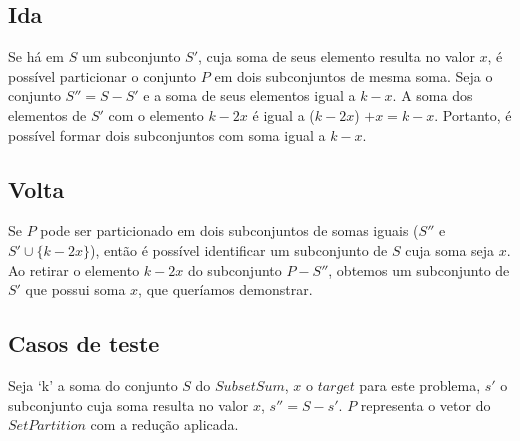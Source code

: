 \documentclass[12pt]{article}
\begin{document}
\subsection{Ida}

Se há em $S$ um subconjunto $S'$, cuja soma de seus elemento resulta no valor $x$, é possível particionar o conjunto $P$ em dois subconjuntos de mesma soma. Seja o conjunto $S'' = S - S'$ e a soma de seus elementos igual a $k-x$. A soma dos elementos de $S'$ com o elemento $k-2x$ é igual a ($k-2x$) $+ x = k-x$. Portanto, é possível formar dois subconjuntos com soma igual a $k-x$.

\subsection{Volta}

Se $P$ pode ser particionado em dois subconjuntos de somas iguais ($S''$ e $S' \cup \{k - 2x\}$), então é possível identificar um subconjunto de $S$ cuja soma seja $x$. Ao retirar o elemento $k - 2x$ do subconjunto $P - S''$, obtemos um subconjunto de $S'$ que possui soma $x$, que queríamos demonstrar.

\subsection{Casos de teste}
Seja ‘k’ a soma do conjunto $S$ do $SubsetSum$, $x$ o $target$ para este problema, $s'$ o subconjunto cuja soma resulta no valor $x$, $s'' = S - s'$. $P$ representa o vetor do $SetPartition$ com a redução aplicada.
\end{document}
